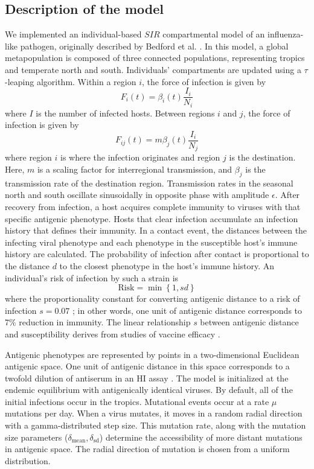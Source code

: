 \documentclass[10pt]{article}
\begin{document}
\subsection{Description of the model}
We implemented an individual-based $SIR$ compartmental model of an influenza-like pathogen, originally described by Bedford et al. \cite{Bedford:2012bx}. 
In this model, a global metapopulation is composed of three connected populations, representing tropics and temperate north and south. 
Individuals' compartments are updated using a $\tau$-leaping algorithm. 
Within a region $i$, the force of infection is given by 
\begin{equation*}
F_{i}(t) = \beta_i (t) \frac{I_i}{N_i}
\end{equation*}
where $I$ is the number of infected hosts. 
Between regions $i$ and $j$, the force of infection is given by
\begin{equation*}
F_{ij}(t) = m\beta_j (t) \frac{I_i}{N_j} 
\end{equation*}
where region $i$ is where the infection originates and region $j$ is the destination.
Here, $m$ is a scaling factor for interregional transmission, and $\beta_j$ is the transmission rate of the destination region. 
Transmission rates in the seasonal north and south oscillate sinusoidally in opposite phase with amplitude $\epsilon$. 
After recovery from infection, a host acquires complete immunity to viruses with that specific antigenic phenotype. 
Hosts that clear infection accumulate an infection history that defines their immunity. 
In a contact event, the distances between the infecting viral phenotype and each phenotype in the susceptible host's immune history are calculated. 
The probability of infection after contact is proportional to the distance $d$ to the closest phenotype in the host's immune history. 
An individual's risk of infection by such a strain is
\begin{equation*}
\text{Risk} = \min\left\{1,sd\right\}
\end{equation*}
where the proportionality constant for converting antigenic distance to a risk of infection $s=0.07$ \cite{Bedford:2012bx}; in other words, one unit of antigenic distance corresponds to 7\% reduction in immunity.
The linear relationship $s$ between antigenic distance and susceptibility derives from studies of vaccine efficacy \cite{Bedford:2012bx, Gupta:2006bv, Park:2009jp}.

Antigenic phenotypes are represented by points in a two-dimensional Euclidean antigenic space. 
One unit of antigenic distance in this space corresponds to a twofold dilution of antiserum in an HI assay \cite{Smith:2004jc}. 
The model is initialized at the endemic equilibrium with antigenically identical viruses. 
By default, all of the initial infections occur in the tropics.
Mutational events occur at a rate $\mu$ mutations per day. 
When a virus mutates, it moves in a random radial direction with a gamma-distributed step size. 
This mutation rate, along with the mutation size parameters ($\delta_\text{mean}, \delta_\text{sd}$) determine the accessibility of more distant mutations in antigenic space. 
The radial direction of mutation is chosen from a uniform distribution.
\end{document}
